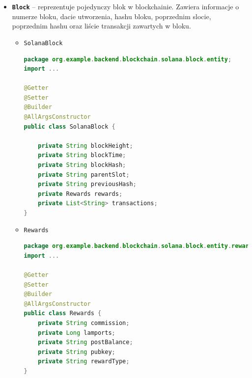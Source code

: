 \begin{itemize}
\begin{itemize}
\begin{lstlisting}[language=Java, style=JavaStyle]
	private List<String> accountKeys;
	private Header header;
	private String recentBlockHash;
	private List<Instruction> instructions;
	private String blockHash;
}
\end{lstlisting}
\item \texttt{Header}
\begin{lstlisting}[language=Java, style=JavaStyle]
package org.example.backend.blockchain.solana.transaction.entity.transaction.message.header;
import ...

@Getter
@Setter
@Builder
@AllArgsConstructor
public class Header {

	private Long numRequiredSignatures;
	private Long numReadonlySignedAccounts;
	private Long numReadonlyUnsignedAccounts;
}

\end{lstlisting}
\item \texttt{Instruction}
\begin{lstlisting}[language=Java, style=JavaStyle]
package org.example.backend.blockchain.solana.transaction.entity.transaction.message.instruction;
import ...

@Getter
@Setter
@Builder
@AllArgsConstructor
public class Instruction {

	private String programIdIndex;
	private List<String> accounts;
	private String data;
	private Integer stackHeight;
}
\end{lstlisting}
\end{itemize}
\item \textbf{\texttt{Block}} -- reprezentuje pojedynczy blok w blockchainie. Zawiera informacje o numerze bloku, dacie utworzenia, hashu bloku, poprzednim slocie, poprzednim hashu oraz liście transakcji zawartych w bloku.
\begin{itemize}
\item \texttt{SolanaBlock}
\begin{lstlisting}[language=Java, style=JavaStyle]
package org.example.backend.blockchain.solana.block.entity;
import ...

@Getter
@Setter
@Builder
@AllArgsConstructor
public class SolanaBlock {

	private String blockHeight;
	private String blockTime;
	private String blockHash;
	private String parentSlot;
	private String previousHash;
	private Rewards rewards;
	private List<String> transactions;
}
\end{lstlisting}
\item \texttt{Rewards}
\begin{lstlisting}[language=Java, style=JavaStyle]
package org.example.backend.blockchain.solana.block.entity.rewards;
import ...

@Getter
@Setter
@Builder
@AllArgsConstructor
public class Rewards {
	private String commission;
	private Long lamports;
	private String postBalance;
	private String pubkey;
	private String rewardType;
}
\end{lstlisting}
\end{itemize}
\end{itemize}

